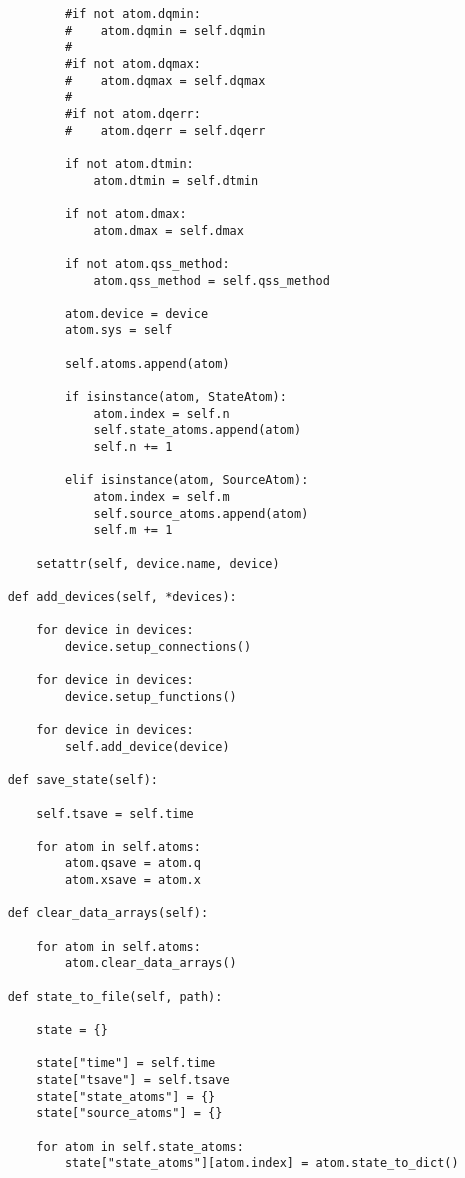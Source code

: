 \begin{lstlisting}
            #if not atom.dqmin:
            #    atom.dqmin = self.dqmin
            #
            #if not atom.dqmax:
            #    atom.dqmax = self.dqmax
            #
            #if not atom.dqerr:
            #    atom.dqerr = self.dqerr

            if not atom.dtmin:
                atom.dtmin = self.dtmin

            if not atom.dmax:
                atom.dmax = self.dmax

            if not atom.qss_method:
                atom.qss_method = self.qss_method

            atom.device = device
            atom.sys = self

            self.atoms.append(atom)

            if isinstance(atom, StateAtom):
                atom.index = self.n
                self.state_atoms.append(atom)
                self.n += 1

            elif isinstance(atom, SourceAtom):
                atom.index = self.m
                self.source_atoms.append(atom)
                self.m += 1

        setattr(self, device.name, device)

    def add_devices(self, *devices):

        for device in devices:
            device.setup_connections()

        for device in devices:
            device.setup_functions()

        for device in devices:
            self.add_device(device)

    def save_state(self):

        self.tsave = self.time

        for atom in self.atoms:
            atom.qsave = atom.q
            atom.xsave = atom.x

    def clear_data_arrays(self):

        for atom in self.atoms:
            atom.clear_data_arrays()

    def state_to_file(self, path):

        state = {}

        state["time"] = self.time
        state["tsave"] = self.tsave
        state["state_atoms"] = {}
        state["source_atoms"] = {}

        for atom in self.state_atoms:
            state["state_atoms"][atom.index] = atom.state_to_dict()


\end{lstlisting}
